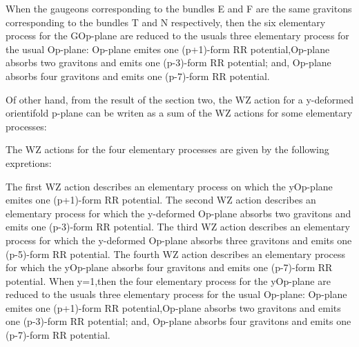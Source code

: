 \documentclass[a4paper,a4paper]{article}
\begin{document}
When the gaugeons corresponding to the bundles E and F are the same gravitons corresponding to the bundles T and N respectively, then the six elementary process for the GOp-plane are reduced to the usuals three elementary process for the usual Op-plane: Op-plane emites one (p+1)-form RR potential,Op-plane
absorbs two gravitons and emits one (p-3)-form RR potential; and, Op-plane absorbs four gravitons and emits one (p-7)-form RR potential.


Of other hand, from the result of the section two, the WZ action for a y-deformed orientifold p-plane can be writen as a sum of the WZ actions for some elementary processes:
\begin{center}
{  \coordHE{} }
\end{center}
The WZ actions for the four elementary processes are given by the following 
expretions:
\begin{center}
{  \coordHE{} }
\end{center} 
\begin{center}
{  \coordHE{} }
\end{center}
\begin{center}
{  \coordHE{} }
\end{center}
\begin{center}
{  \coordHE{} }
\end{center}

The first WZ action describes an elementary process on which the yOp-plane emites one (p+1)-form RR potential.
The second WZ action describes an elementary process for which the y-deformed
Op-plane absorbs two gravitons and emits one (p-3)-form RR potential.
The third WZ action describes an elementary process for which the y-deformed
Op-plane absorbs three gravitons and emits one (p-5)-form RR potential.
The fourth WZ action describes an elementary process for which the yOp-plane absorbs four gravitons and emits one (p-7)-form RR potential.
When y=1,then the four elementary process for the yOp-plane are reduced to the usuals three elementary process for the usual Op-plane: Op-plane emites one (p+1)-form RR potential,Op-plane
absorbs two gravitons and emits one (p-3)-form RR potential; and, Op-plane absorbs four gravitons and emits one (p-7)-form RR potential.
 
\end{document}
